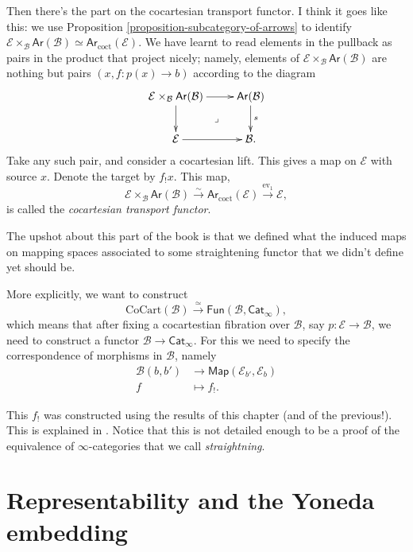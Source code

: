 \noindent
Then there's the part on the cocartesian transport functor.
I think it goes like this: we use Proposition
\ref{proposition-subcategory-of-arrows} to identify
$\mathcal{E}\times_{\mathcal{B}}\mathsf{Ar}(\mathcal{B}) \simeq
\mathsf{Ar}_{\text{coct}}(\mathcal{E})$.
We have learnt to read elements in the pullback
as pairs in the product that project nicely; namely,
elements of $\mathcal{E}\times_{\mathcal{B}}\mathsf{Ar}(\mathcal{B})$ 
are nothing but pairs $(x,f:p(x)\to b)$ according to the diagram
$$
\xymatrix{
\mathcal{E}\times_{\mathcal{B}}\mathsf{Ar}(\mathcal{B})
\ar[r]\ar[d]\ar@{}[dr]|-{\lrcorner}&
\mathsf{Ar}(\mathcal{B})\ar[d]^{s}\\
\mathcal{E}\ar[r]&\mathcal{B}.
}
$$
Take any such pair, and consider a cocartesian lift.
This gives a map on $\mathcal{E}$ with source $x$.
Denote the target by $f_!x$.
This map,
$$
\mathcal{E}\times_{\mathcal{B}}\mathsf{Ar}(\mathcal{B})
\xrightarrow{\sim}\mathsf{Ar}_{\text{coct}}(\mathcal{E})
\xrightarrow{\text{ev}_1}\mathcal{E},
$$
is called the {\it cocartesian transport functor}.

\medskip\noindent
The upshot about this part of the book
is that we defined what the induced maps on mapping spaces
associated to some straightening functor
that we didn't define yet should be.

More explicitly, we want to construct
$$
\text{CoCart}(\mathcal{B})
\xrightarrow{\simeq}
\mathsf{Fun}(\mathcal{B},\mathsf{Cat}_{\infty}),
$$
which means that after fixing a cocartestian fibration
over $\mathcal{B}$, say
$p:\mathcal{E} \to \mathcal{B}$,
we need to construct a functor $\mathcal{B} \to \mathsf{Cat}_{\infty}$.
For this we need to specify 
the correspondence of morphisms in $\mathcal{B}$,
namely
\begin{align*}
\mathcal{B}(b,b') &\longrightarrow 
\mathsf{Map}(\mathcal{E}_{b'}, \mathcal{E}_b) \\
f &\longmapsto f_!.
\end{align*}

\noindent
This $f_!$ was constructed using the results of this chapter
(and of the previous!).
This is explained in \cite[Section 3.7]{Rune}.
Notice that this is not detailed
enough to be a proof of the equivalence
of $\infty$-categories that we call {\it straightning}.

\section{Representability and the Yoneda embedding}
\label{section-representability}

